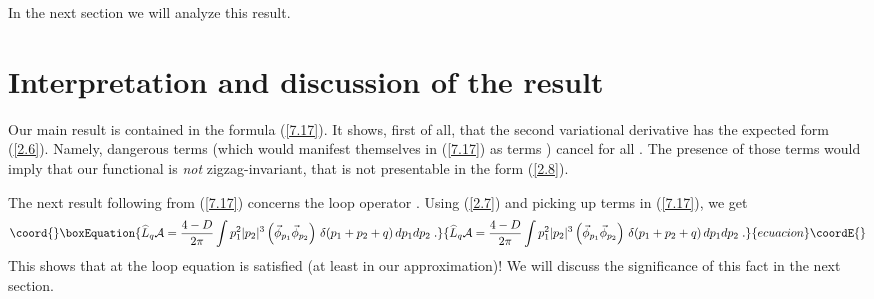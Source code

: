 \documentclass[a4paper,12pt]{article}
\numberwithin{equation}{section}
\begin{document}
 In the next section we will analyze this result.


\section{Interpretation and discussion of the result}

Our main result is contained in the formula (\ref{7.17}). It shows, first of
all, that the second variational derivative has the expected form (\ref{2.6}).
Namely, dangerous terms \coordHE{} (which would manifest
themselves in (\ref{7.17}) as terms \coordHE{}) cancel for all \coordHE{}.
The presence of those terms would imply that our functional is \emph{not} zigzag-invariant,
that is not presentable in the form (\ref{2.8}). 

The next result following from (\ref{7.17}) concerns the loop operator \coordHE{}.
Using (\ref{2.7}) and picking up \coordHE{} terms in (\ref{7.17}), we get
\begin{equation}\coord{}\boxEquation{
\label{8.1}
\widehat{{L}}_{q}\mathcal{A}=\frac{4-D}{2\pi }\int p_{1}^{2}|p_{2}|^{3}\left( \vec{\phi }_{p_{1}}\vec{\phi }_{p_{2}}\right) \, \delta (p_{1}+p_{2}+q)\, dp_{1}dp_{2}\; .
}{
\widehat{{L}}_{q}\mathcal{A}=\frac{4-D}{2\pi }\int p_{1}^{2}|p_{2}|^{3}\left( \vec{\phi }_{p_{1}}\vec{\phi }_{p_{2}}\right) \, \delta (p_{1}+p_{2}+q)\, dp_{1}dp_{2}\; .
}{ecuacion}\coordE{}\end{equation}
This shows that at \coordHE{} the loop equation is satisfied (at least in our
approximation)! We will discuss the significance of this fact in the next section.
\end{document}
